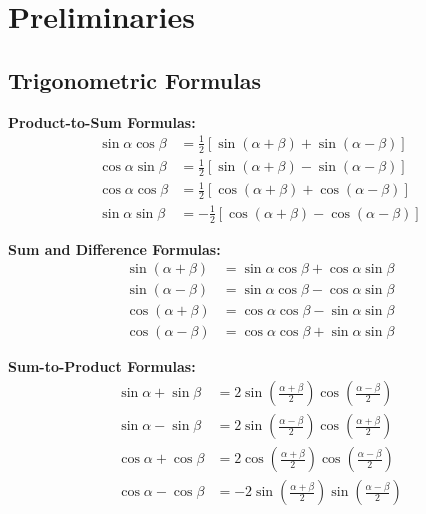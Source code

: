 \documentclass[11pt]{../../TexTemplate/elegantbook}
\begin{document}
\mainmatter         %

\chapter{Preliminaries} %
\section{Trigonometric Formulas} %

\textbf{Product-to-Sum Formulas:}
\begin{align*}
\sin\alpha \cos\beta &= \frac{1}{2} \left[ \sin(\alpha + \beta) + \sin(\alpha - \beta) \right] \\
\cos\alpha \sin\beta &= \frac{1}{2} \left[ \sin(\alpha + \beta) - \sin(\alpha - \beta) \right] \\
\cos\alpha \cos\beta &= \frac{1}{2} \left[ \cos(\alpha + \beta) + \cos(\alpha - \beta) \right] \\
\sin\alpha \sin\beta &= -\frac{1}{2} \left[ \cos(\alpha + \beta) - \cos(\alpha - \beta) \right]
\end{align*}

\textbf{Sum and Difference Formulas:}
\begin{align*}
\sin(\alpha + \beta) &= \sin\alpha \cos\beta + \cos\alpha \sin\beta \\
\sin(\alpha - \beta) &= \sin\alpha \cos\beta - \cos\alpha \sin\beta \\
\cos(\alpha + \beta) &= \cos\alpha \cos\beta - \sin\alpha \sin\beta \\
\cos(\alpha - \beta) &= \cos\alpha \cos\beta + \sin\alpha \sin\beta
\end{align*}

\textbf{Sum-to-Product Formulas:}
\begin{align*}
\sin\alpha + \sin\beta &= 2 \sin\left( \frac{\alpha + \beta}{2} \right) \cos\left( \frac{\alpha - \beta}{2} \right) \\
\sin\alpha - \sin\beta &= 2 \sin\left( \frac{\alpha - \beta}{2} \right) \cos\left( \frac{\alpha + \beta}{2} \right) \\
\cos\alpha + \cos\beta &= 2 \cos\left( \frac{\alpha + \beta}{2} \right) \cos\left( \frac{\alpha - \beta}{2} \right) \\
\cos\alpha - \cos\beta &= -2 \sin\left( \frac{\alpha + \beta}{2} \right) \sin\left( \frac{\alpha - \beta}{2} \right)
\end{align*}
\end{document}
